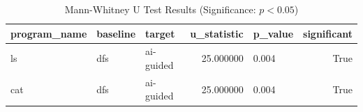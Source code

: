 \begin{table}[htbp]
\caption{Mann-Whitney U Test Results (Significance: $p < 0.05$)}
\label{tab:significance_tests}
\begin{tabular}{lllrlr}
\toprule
program_name & baseline & target & u_statistic & p_value & significant \\
\midrule
ls & dfs & ai-guided & 25.000000 & 0.004 & True \\
cat & dfs & ai-guided & 25.000000 & 0.004 & True \\
\bottomrule
\end{tabular}
\end{table}
